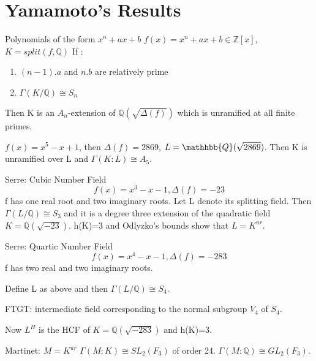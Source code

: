 \documentclass[10pt]{beamer}
\begin{document}
\section{Yamamoto's Results}
\begin{frame}{Polynomials of the form $x^n+ax+b$}
       $ f(x) = x^n+ax+b \in \mathbb{Z}[x]$,
$K=split(f,\mathbb{Q})$
If :
\begin{enumerate}
    \item $(n-1).a$ and $n.b$ are relatively prime 
    \item $\Gamma(K/\mathbb{Q}) \cong S_n$
\end{enumerate}\par
Then K is an $A_n$-extension of $\mathbb{Q}(\sqrt{\Delta(f)})$ which is unramified at all finite primes. \begin{example}
$f(x) = x^5-x+1$, then $\Delta(f)= 2869$, $L = \mathhbb{Q}(\sqrt{2869})$. Then K is unramified over L and $\Gamma(K:L)\cong A_5.$
\end{example}  
\end{frame}
\begin{frame}{Serre: Cubic Number Field}
 \begin{equation}
 f(x)=x^3-x-1, \Delta(f)=-23
\end{equation}
 f has one real root and two imaginary roots. Let L denote its splitting field. Then $\Gamma(L/\mathbb{Q})\cong S_3$ and it is a degree three extension of the quadratic field $K= \mathbb{Q}(\sqrt{-23})$.  h(K)=3 and Odlyzko's bounds show that $L=K^{ur}$.
  \begin{center}
\end{center}
\end{frame}
\begin{frame}{Serre: Quartic Number Field}
 \begin{equation}
    f(x)=x^4-x-1, \Delta(f)=-283
\end{equation}
f has two real and two imaginary roots. \par Define L as above and then $\Gamma(L/\mathbb{Q})\cong S_4$. \par FTGT: intermediate field corresponding to the normal subgroup $V_4$ of $S_4$. \par Now $L^H$ is the HCF of $K= \mathbb{Q}(\sqrt{-283})$ and h(K)=3. \par
Martinet: $M=K^{ur}$
$\Gamma(M:K)\cong SL_2(F_3)$ of order 24. $\Gamma(M:\mathbb{Q})\cong GL_2(F_3)$. 
\end{frame}
\end{document}
